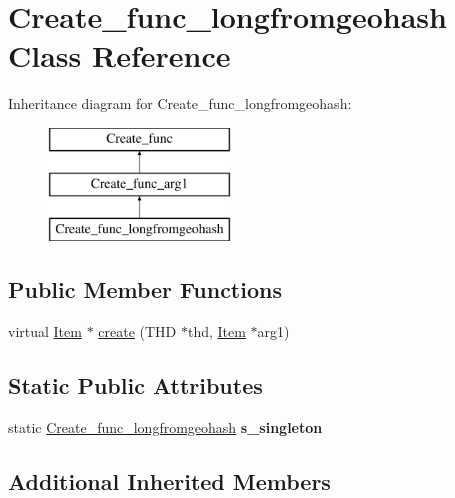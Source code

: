 \hypertarget{classCreate__func__longfromgeohash}{}\section{Create\+\_\+func\+\_\+longfromgeohash Class Reference}
\label{classCreate__func__longfromgeohash}
Inheritance diagram for Create\+\_\+func\+\_\+longfromgeohash\+:\begin{figure}[H]
\begin{center}
\leavevmode
\includegraphics[height=3.000000cm]{classCreate__func__longfromgeohash}
\end{center}
\end{figure}
\subsection*{Public Member Functions}
\begin{DoxyCompactItemize}
\item 
virtual \mbox{\hyperlink{classItem}{Item}} $\ast$ \mbox{\hyperlink{classCreate__func__longfromgeohash_a10d1a05c7add046998ed1aa126c23f29}{create}} (T\+HD $\ast$thd, \mbox{\hyperlink{classItem}{Item}} $\ast$arg1)
\end{DoxyCompactItemize}
\subsection*{Static Public Attributes}
\begin{DoxyCompactItemize}
\item 
\mbox{\label{classCreate__func__longfromgeohash_a3293340be166dc7e9e0558c46763ee44}} 
static \mbox{\hyperlink{classCreate__func__longfromgeohash}{Create\+\_\+func\+\_\+longfromgeohash}} {\bfseries s\+\_\+singleton}
\end{DoxyCompactItemize}
\subsection*{Additional Inherited Members}


